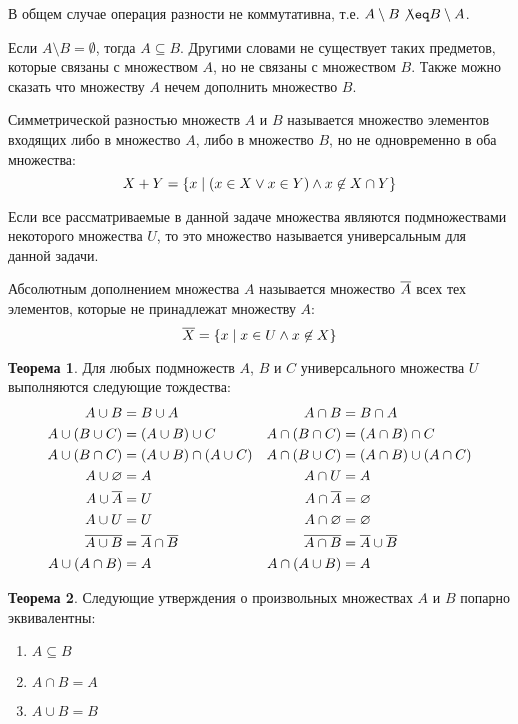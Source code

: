 \documentclass[letterpaper, 10pt]{article}
\theoremstyle{definition}
\newtheorem{thm}{Теорема}[section]
\begin{document}
В общем случае операция разности не коммутативна, т.е. $A \setminus B \not\eq B
\setminus A$.

Если $A \setminus B = \emptyset$, тогда $A \subseteq B$. Другими словами не
существует таких предметов, которые связаны с множеством $A$, но не связаны с
множеством $B$. Также можно сказать что множеству $A$ нечем дополнить множество
$B$.

Симметрической разностью множеств $A$ и $B$ называется множество элементов
входящих либо в множество $A$, либо в множество $B$, но не одновременно в оба
множества:
$$
X + Y = \left\{x \mid (x \in X \lor x \in Y) \land x \not\in X \cap Y\right\}
$$

Если все рассматриваемые в данной задаче множества являются подмножествами
некоторого множества $U$, то это множество называется универсальным для данной
задачи.

Абсолютным дополнением множества $A$ называется множество $\overline{A}$ всех
тех элементов, которые не принадлежат множеству $A$:
$$
\overline{X} = \left\{x \mid x \in U \land x \not\in X\right\}
$$

\begin{thm}
	Для любых подмножеств $A$, $B$ и $C$ универсального множества $U$
	выполняются следующие тождества:
	\begin{align*}
		A \cup B &= B \cup A & A \cap B &= B \cap A \\
		A \cup (B \cup C) &= (A \cup B) \cup C & A \cap (B \cap C) &= (A \cap B) \cap C \\
		A \cup (B \cap C) &= (A \cup B) \cap (A \cup C) & A \cap (B \cup C) &= (A \cap B) \cup (A \cap C) \\
		A \cup \varnothing &= A & A \cap U &= A \\
		A \cup \overline{A} &= U & A \cap \overline{A} &= \varnothing \\
		A \cup U &= U & A \cap \varnothing &= \varnothing \\
		\overline{A \cup B} &= \overline{A} \cap \overline{B} & \overline{A \cap B} &= \overline{A} \cup \overline{B} \\
		A \cup (A \cap B) &= A & A \cap (A \cup B) &= A \\
	\end{align*}
\end{thm}

\begin{thm}
	Следующие утверждения о произвольных множествах $A$ и $B$ попарно
	эквивалентны:
	\begin{enumerate}
		\item $A \subseteq B$
		\item $A \cap B = A$
		\item $A \cup B = B$
	\end{enumerate}
\end{thm}
\end{document}
